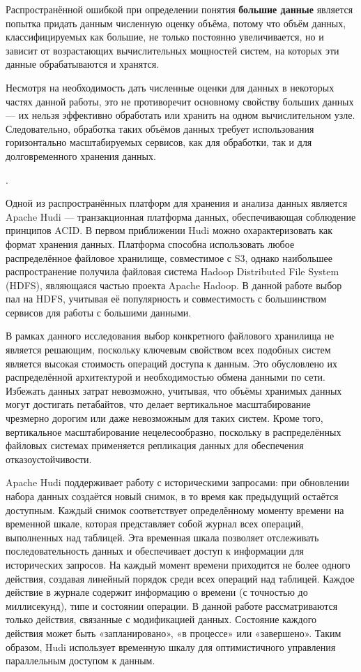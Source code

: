 Распространённой ошибкой при определении понятия \textbf{большие данные} является попытка придать данным численную оценку объёма, потому что объём данных, классифицируемых как большие, не только постоянно увеличивается, но и зависит от возрастающих вычислительных мощностей систем, на которых эти данные обрабатываются и хранятся. 

Несмотря на необходимость дать численные оценки для данных в некоторых частях данной работы, это не противоречит основному свойству больших данных --- их нельзя эффективно обработать или хранить на одном вычислительном узле. Следовательно, обработка таких объёмов данных требует использования горизонтально масштабируемых сервисов, как для обработки, так и для долговременного хранения данных.

 \cite{BoumaT_Datalake}.

Одной из распространённых платформ для хранения и анализа данных является Apache Hudi — транзакционная платформа данных, обеспечивающая соблюдение принципов ACID. В первом приближении Hudi можно охарактеризовать как формат хранения данных. Платформа способна использовать любое распределённое файловое хранилище, совместимое с S3, однако наибольшее распространение получила файловая система Hadoop Distributed File System (HDFS), являющаяся частью проекта Apache Hadoop. В данной работе выбор пал на HDFS, учитывая её популярность и совместимость с большинством сервисов для работы с большими данными.

В рамках данного исследования выбор конкретного файлового хранилища не является решающим, поскольку ключевым свойством всех подобных систем является высокая стоимость операций доступа к данным. Это обусловлено их распределённой архитектурой и необходимостью обмена данными по сети. Избежать данных затрат невозможно, учитывая, что объёмы хранимых данных могут достигать петабайтов, что делает вертикальное масштабирование чрезмерно дорогим или даже невозможным для таких систем. Кроме того, вертикальное масштабирование нецелесообразно, поскольку в распределённых файловых системах применяется репликация данных для обеспечения отказоустойчивости.

Apache Hudi поддерживает работу с историческими запросами: при обновлении набора данных создаётся новый снимок, в то время как предыдущий остаётся доступным. Каждый снимок соответствует определённому моменту времени на временной шкале, которая представляет собой журнал всех операций, выполненных над таблицей. Эта временная шкала позволяет отслеживать последовательность данных и обеспечивает доступ к информации для исторических запросов. На каждый момент времени приходится не более одного действия, создавая линейный порядок среди всех операций над таблицей. Каждое действие в журнале содержит информацию о времени (с точностью до миллисекунд), типе и состоянии операции. В данной работе рассматриваются только действия, связанные с модификацией данных. Состояние каждого действия может быть «запланировано», «в процессе» или «завершено». Таким образом, Hudi использует временную шкалу для оптимистичного управления параллельным доступом к данным.

